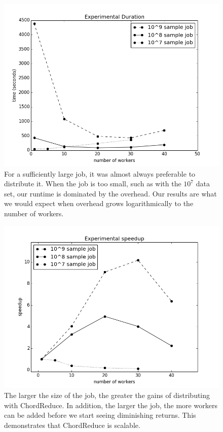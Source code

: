 \documentclass[10pt, conference, compsocconf]{IEEEtran}
\begin{document}
\begin{figure}
    \includegraphics[width=\linewidth]{expTime}
    \caption{For a sufficiently large job, it was almost always preferable to distribute it.  When the job is too small, such as with the $10^{7}$ data set, our runtime is dominated by the overhead.  Our results are what we would expect when overhead grows logarithmically to the number of workers.}
    \label{expTime}
\end{figure}


\begin{figure}
    \includegraphics[width=\linewidth]{expSpeed}
    \caption{The larger the size of the job, the greater the gains of distributing with ChordReduce.  In addition, the larger the job, the more workers can be added before we start seeing diminishing returns.  This demonstrates that ChordReduce is scalable.}
    \label{expSpeed}
\end{figure}
\end{document}
